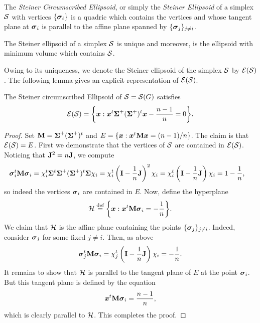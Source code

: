 \begin{definition}
\label{def:steiner_ellipsoid}
The \emph{Steiner Circumscribed Ellipsoid}, or simply the \emph{Steiner Ellipsoid} of a simplex $\mathcal{S}$ with vertices $\{\vb*{\sigma}_i\}$ is a quadric which contains the vertices and whose tangent plane at $\vb*{\sigma}_i$ is parallel to the affine plane spanned by $\{\vb*{\sigma}_j\}_{j\neq i}$. 
\end{definition}

\begin{theorem}
The Steiner ellipsoid of a simplex $\mathcal{S}$ is unique and moreover, is the ellipsoid with minimum volume which contains $\mathcal{S}$. 
\end{theorem}

Owing to its uniqueness, we denote the Steiner ellipsoid of the simplex $\mathcal{S}$ by $\mathcal{E}(\mathcal{S})$. The following lemma gives an explicit representation of $\mathcal{E}(\mathcal{S})$. 

\begin{lemma}
The Steiner circumscribed Ellipsoid of $\mathcal{S}=\mathcal{S}(G)$ satisfies
\begin{equation}
\label{eq:steinerE}
    \mathcal{E}(\mathcal{S}) = \bigg\{\vb*{x}: \vb*{x}^t \boldsymbol{\Sigma}^+(\boldsymbol{\Sigma}^+)^t \vb*{x} - \frac{n-1}{n}=0\bigg\}.
\end{equation}
\end{lemma}
\begin{proof}
Set $\vb{M}=\boldsymbol{\Sigma}^+(\boldsymbol{\Sigma}^+)^t$ and $E=\{\vb*{x}:\vb*{x}^t \vb{M}\vb*{x}=(n-1)/n\}$. The claim is that $\mathcal{E}(\mathcal{S})=E$.  
First we demonstrate that the vertices of $\mathcal{S}$ are contained in $\mathcal{E}(\mathcal{S})$. Noticing that $\vb{J}^2=n\vb{J}$, we compute 
\begin{align*}
    \vb*{\sigma}_i^t \vb{M} \vb*{\sigma}_i &= \chi_i^t \boldsymbol{\Sigma}^t \boldsymbol{\Sigma}^+(\boldsymbol{\Sigma}^+)^t \boldsymbol{\Sigma} \chi_i = \chi_i^t \left(\vb{I}-\frac{1}{n}\vb{J}\right)^2 \chi_i = \chi_i^t \left(\vb{I}-\frac{1}{n}\vb{J}\right) \chi_i = 1 - \frac{1}{n}, 
\end{align*}
so indeed the vertices $\vb*{\sigma}_i$ are contained in $E$. Now, define the hyperplane 
\[\mathcal{H}\overset{\text{def}}{=} \bigg\{\vb*{x}:\vb*{x}^t \vb{M} \vb*{\sigma}_i = -\frac{1}{n}\bigg\}.\]
We claim that $\mathcal{H}$ is the affine plane containing the points $\{\vb*{\sigma}_j\}_{j\neq i}$. Indeed, consider $\vb*{\sigma}_j$ for some fixed $j\neq i$. Then, as above 
\[\vb*{\sigma}_j^t \vb{M}\vb*{\sigma}_i = \chi_j^t \left(\vb{I}-\frac{1}{n}\vb{J}\right) \chi_i = -\frac{1}{n}. \]
It remains to show that $\mathcal{H}$ is parallel to the tangent plane of $E$ at the point $\vb*{\sigma}_i$. But this tangent plane is defined by the equation~\cite{fiedler2005geometry} 
\[\vb*{x}^t \vb{M}\vb*{\sigma}_i =\frac{n-1}{n},\]
which is clearly parallel to $\mathcal{H}$. This completes the proof.
\end{proof}

